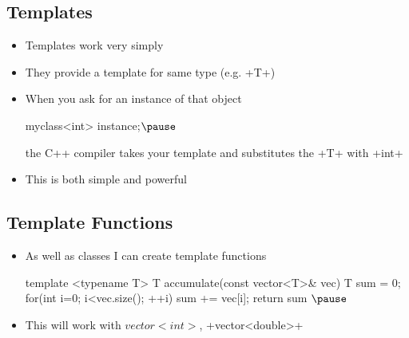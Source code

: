 
\begin{slide}
\section{Templates}

\begin{PauseHighLight}
  \begin{itemize}
  \item Templates work very simply\pause
  \item They provide a template for same type (e.g. \jl+T+)\pause
  \item When you ask for an instance of that object
    \begin{cpp}
      myclass<int> instance;$\pause$
    \end{cpp}
    the C++ compiler takes your template and substitutes the \jl+T+
    with \jl+int+\pause
  \item This is both simple and powerful\pause
  \end{itemize}
\end{PauseHighLight}

\end{slide}


\begin{slide}
\section{Template Functions}

\begin{PauseHighLight}
  \begin{itemize}
  \item As well as classes I can create template functions
    \begin{cpp}
      template <typename T>
      T accumulate(const vector<T>& vec) {
        T sum = 0;
        for(int i=0; i<vec.size(); ++i) {
          sum += vec[i];
        }
        return sum
      }$\pause$
    \end{cpp}
  \item This will work with \jl$vector<int>$, \jl+vector<double>+\pause
  \end{itemize}
\end{PauseHighLight}


\end{slide}

